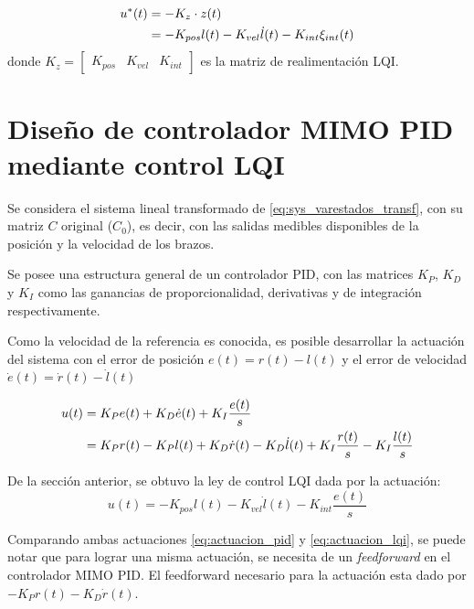 \begin{align}
    u^*(t) & = - K_z \cdot z(t) \notag \\
    & = -K_{pos} l(t) - K_{vel} \dot{l}(t) - K_{int} \xi_{int}(t)
\end{align}
donde $K_z = \begin{bmatrix} K_{pos} & K_{vel} & K_{int} \end{bmatrix}$ es la matriz de realimentación LQI.


\section{Diseño de controlador MIMO PID mediante control LQI}
\label{sec:mimopid_stewart}

Se considera el sistema lineal transformado de \ref{eq:sys_varestados_transf}, con su matriz $C$ original ($C_0$), es decir, con las salidas medibles disponibles de la posición y la velocidad de los brazos. 

Se posee una estructura general de un controlador PID, con las matrices $K_P$, $K_D$ y $K_I$ como las ganancias de proporcionalidad, derivativas y de integración respectivamente. 

Como la velocidad de la referencia es conocida, es posible desarrollar la actuación del sistema con el error de posición $ e(t) = r(t) - l(t)$ y el error de velocidad $\dot{e}(t) = \dot{r}(t) - \dot{l}(t)$

\begin{align} \label{eq:actuacion_pid}
    u(t) & = K_P e(t) + K_D \dot{e}(t) + K_I \frac{e(t)}{s} \notag \\
    & = K_P r(t) - K_P l(t) + K_D \dot{r}(t) - K_D \dot{l}(t) + K_I \frac{r(t)}{s} - K_I \frac{l(t)}{s}
\end{align}

De la sección anterior, se obtuvo la ley de control LQI dada por la actuación:
\begin{equation} \label{eq:actuacion_lqi}
    u(t) = -K_{pos} l(t) - K_{vel} \dot{l}(t) - K_{int} \frac{e(t)}{s}
\end{equation}

Comparando ambas actuaciones \ref{eq:actuacion_pid} y \ref{eq:actuacion_lqi}, se puede notar que para lograr una misma actuación, se necesita de un \textit{feedforward} en el controlador MIMO PID. El feedforward necesario para la actuación esta dado por $-K_P r(t) - K_D \dot{r}(t)$.

